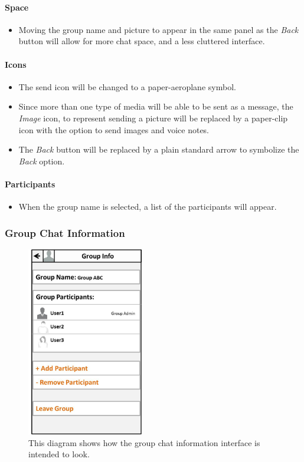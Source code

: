 \documentclass[11pt]{article}
\begin{document}
\paragraph{Space}
\begin{itemize}
\item	Moving the group name and picture to appear in the same panel as the \textit{Back} button will allow for more chat space, and a less cluttered interface.
\end{itemize}

\paragraph{Icons}
\begin{itemize}
\item	The send icon will be changed to a paper-aeroplane symbol.  
\item Since more than one type of media will be able to be sent as a message, the \textit{Image} icon, to represent sending a picture will be replaced by a paper-clip icon with the option to send images and voice notes. 
\item The \textit{Back} button will be replaced by a plain standard arrow to symbolize the \textit{Back} option.  
\end{itemize}

\paragraph{Participants}
\begin{itemize}
\item	When the group name is selected, a list of the participants will appear.
\end{itemize}


\subsubsection{Group Chat Information}
\begin{figure}[H]
\centering
\includegraphics[width=2in]{./images/SettingF.jpg}
\caption[Sample Group Chat Information Screen]{This diagram shows how the group chat information interface is intended to look.}
\label{cd-group-chat-settings-interface}
\end{figure}
\end{document}
